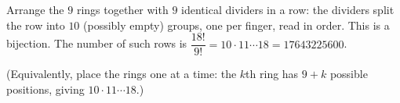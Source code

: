 Arrange the $9$ rings together with $9$ identical dividers in a row: the dividers split the row into $10$ (possibly empty) groups, one per finger, read in order. This is a bijection. The number of such rows is $\dfrac{18!}{9!}=10\cdot11\cdots18=\boxed{17643225600}$.

(Equivalently, place the rings one at a time: the $k$th ring has $9+k$ possible positions, giving $10\cdot11\cdots18$.)
